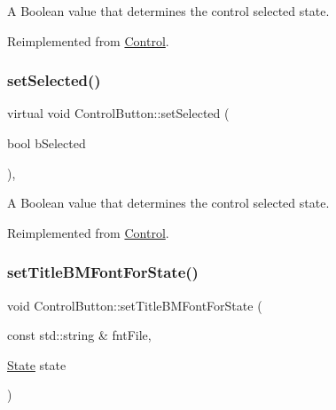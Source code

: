 A Boolean value that determines the control selected state. 

Reimplemented from \hyperlink{classControl_ab35419d8bb194f540e838a3b796258a7}{Control}.

\mbox{\label{classControlButton_a13c5ecf7e0d2d6ac420dc9d6b6bba24b}} 
\subsubsection{\texorpdfstring{set\+Selected()}{setSelected()}\hspace{0.1cm}{\footnotesize\ttfamily [2/2]}}
{\footnotesize\ttfamily virtual void Control\+Button\+::set\+Selected (\begin{DoxyParamCaption}\item[{bool}]{b\+Selected }\end{DoxyParamCaption})\hspace{0.3cm}{\ttfamily [override]}, {\ttfamily [virtual]}}

A Boolean value that determines the control selected state. 

Reimplemented from \hyperlink{classControl_ab35419d8bb194f540e838a3b796258a7}{Control}.

\mbox{\label{classControlButton_afe4abc45ed9984bdc0e86fd2fea3bd73}} 
\subsubsection{\texorpdfstring{set\+Title\+B\+M\+Font\+For\+State()}{setTitleBMFontForState()}\hspace{0.1cm}{\footnotesize\ttfamily [1/2]}}
{\footnotesize\ttfamily void Control\+Button\+::set\+Title\+B\+M\+Font\+For\+State (\begin{DoxyParamCaption}\item[{const std\+::string \&}]{fnt\+File,  }\item[{\hyperlink{classControl_a89e9598cd785841ac91cff3c4798c469}{State}}]{state }\end{DoxyParamCaption})\hspace{0.3cm}{\ttfamily [virtual]}}

